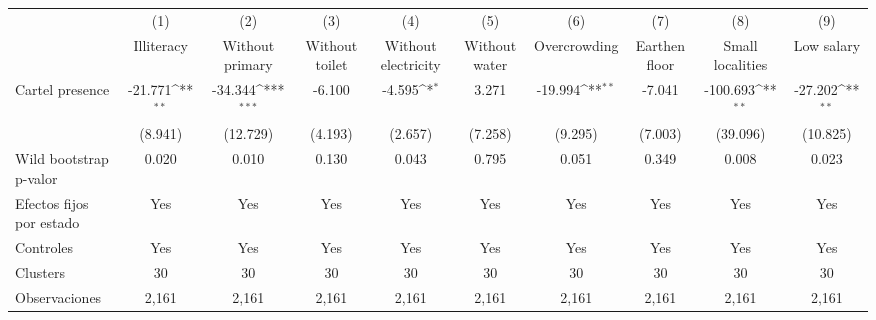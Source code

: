 {
\def\sym#1{\ifmmode^{#1}\else\(^{#1}\)\fi}
\begin{tabular}{l*{9}{c}}
\toprule
                    &\multicolumn{1}{c}{(1)}&\multicolumn{1}{c}{(2)}&\multicolumn{1}{c}{(3)}&\multicolumn{1}{c}{(4)}&\multicolumn{1}{c}{(5)}&\multicolumn{1}{c}{(6)}&\multicolumn{1}{c}{(7)}&\multicolumn{1}{c}{(8)}&\multicolumn{1}{c}{(9)}\\
                    &\multicolumn{1}{c}{Illiteracy}&\multicolumn{1}{c}{Without primary}&\multicolumn{1}{c}{Without toilet}&\multicolumn{1}{c}{Without electricity}&\multicolumn{1}{c}{Without water}&\multicolumn{1}{c}{Overcrowding}&\multicolumn{1}{c}{Earthen floor}&\multicolumn{1}{c}{Small localities}&\multicolumn{1}{c}{Low salary}\\
\midrule
Cartel presence     &     -21.771\sym{**} &     -34.344\sym{***}&      -6.100         &      -4.595\sym{*}  &       3.271         &     -19.994\sym{**} &      -7.041         &    -100.693\sym{**} &     -27.202\sym{**} \\
                    &     (8.941)         &    (12.729)         &     (4.193)         &     (2.657)         &     (7.258)         &     (9.295)         &     (7.003)         &    (39.096)         &    (10.825)         \\
\midrule
Wild bootstrap p-valor&       0.020         &       0.010         &       0.130         &       0.043         &       0.795         &       0.051         &       0.349         &       0.008         &       0.023         \\
Efectos fijos por estado&         Yes         &         Yes         &         Yes         &         Yes         &         Yes         &         Yes         &         Yes         &         Yes         &         Yes         \\
Controles           &         Yes         &         Yes         &         Yes         &         Yes         &         Yes         &         Yes         &         Yes         &         Yes         &         Yes         \\
Clusters            &          30         &          30         &          30         &          30         &          30         &          30         &          30         &          30         &          30         \\
Observaciones       &       2,161         &       2,161         &       2,161         &       2,161         &       2,161         &       2,161         &       2,161         &       2,161         &       2,161         \\
\bottomrule
\end{tabular}
}
